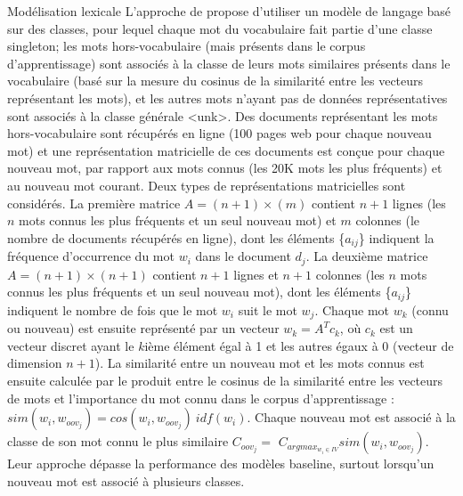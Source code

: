 \documentclass{style/these}
\let\oldcite=\cite
\renewcommand{\cite}[1]{{\fontfamily{qcs}\selectfont{\color{darkerblue}[\oldcite{#1}]}}}
\begin{document}
\begin{part}{Modélisation lexicale}
L'approche de \cite{Naptali:2012} propose d'utiliser un modèle de langage basé sur des classes, pour lequel chaque mot du vocabulaire fait partie d'une classe singleton; les mots hors-vocabulaire (mais présents dans le corpus d'apprentissage) sont associés à la classe de leurs mots similaires présents dans le vocabulaire (basé sur la mesure du cosinus de la similarité entre les vecteurs représentant les mots), et les autres mots n'ayant pas de données représentatives sont associés à la classe générale <unk>. 
Des documents représentant les mots hors-vocabulaire sont récupérés en ligne (100 pages web pour chaque nouveau mot) et une représentation matricielle de ces documents est conçue pour chaque nouveau mot, par rapport aux mots connus (les 20K mots les plus fréquents) et au nouveau mot courant. 
Deux types de représentations matricielles sont considérés.  
La première matrice $A=(n+1)\times(m)$ contient $n+1$ lignes (les $n$ mots connus les plus fréquents et un seul nouveau mot) et $m$ colonnes (le nombre de documents récupérés en ligne), dont les éléments \{$a_{ij}$\} indiquent la fréquence d'occurrence du mot $w_i$ dans le document $d_j$. 
La deuxième matrice $A=(n+1)\times(n+1)$ contient $n+1$ lignes et $n+1$ colonnes (les $n$ mots connus les plus fréquents et un seul nouveau mot), dont les éléments \{$a_{ij}$\} indiquent le nombre de fois que le mot $w_i$ suit le mot $w_j$. 
Chaque mot $w_k$ (connu ou nouveau) est ensuite représenté par un vecteur $w_k=A^Tc_k$, où $c_k$ est un vecteur discret ayant le $k$ième élément égal à 1 et les autres égaux à 0 (vecteur de dimension $n+1$). 
La similarité entre un nouveau mot et les mots connus est ensuite calculée par le produit entre le cosinus de la similarité entre les vecteurs de mots et l'importance du mot connu dans le corpus d'apprentissage : 
$sim(w_i,w_{{oov}_j})=cos(w_i, w_{{oov}_j}) \ idf(w_i)$. %
Chaque nouveau mot est associé à la classe de son mot connu le plus similaire $C_{{oov_j}}=$ $C_{{argmax_{w_i \in IV}}} sim(w_i,w_{oov_j})$. 
Leur approche dépasse la performance des modèles baseline, surtout lorsqu'un nouveau mot est associé à plusieurs classes.  


\end{part}
\end{document}
